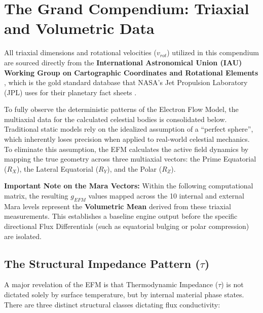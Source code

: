\documentclass[11pt, a4paper]{article}
\begin{document}
\clearpage
\section{The Grand Compendium: Triaxial and Volumetric Data}

  All triaxial dimensions and rotational velocities ($v_{rot}$) utilized in this compendium are sourced directly from the \textbf{International Astronomical Union (IAU) Working Group on Cartographic Coordinates and Rotational Elements} \cite{iau2018}, which is the gold standard database that NASA's Jet Propulsion Laboratory (JPL) uses for their planetary fact sheets \cite{nasa2024}.

  To fully observe the deterministic patterns of the Electron Flow Model, the multiaxial data for the calculated celestial bodies is consolidated below. Traditional static models rely on the idealized assumption of a ``perfect sphere'', which inherently loses precision when applied to real-world celestial mechanics. To eliminate this assumption, the EFM calculates the active field dynamics by mapping the true geometry across three multiaxial vectors: the Prime Equatorial ($R_X$), the Lateral Equatorial ($R_Y$), and the Polar ($R_Z$).

  \textbf{Important Note on the Mara Vectors:} Within the following computational matrix, the resulting $g_{EFM}$ values mapped across the 10 internal and external Mara levels represent the \textbf{Volumetric Mean} derived from these triaxial measurements. This establishes a baseline engine output before the specific directional Flux Differentials (such as equatorial bulging or polar compression) are isolated.

\subsection{The Structural Impedance Pattern (\texorpdfstring{$\tau$}{tau})}

  A major revelation of the EFM is that Thermodynamic Impedance ($\tau$) is not dictated solely by surface temperature, but by internal material phase states. There are three distinct structural classes dictating flux conductivity:
\end{document}
